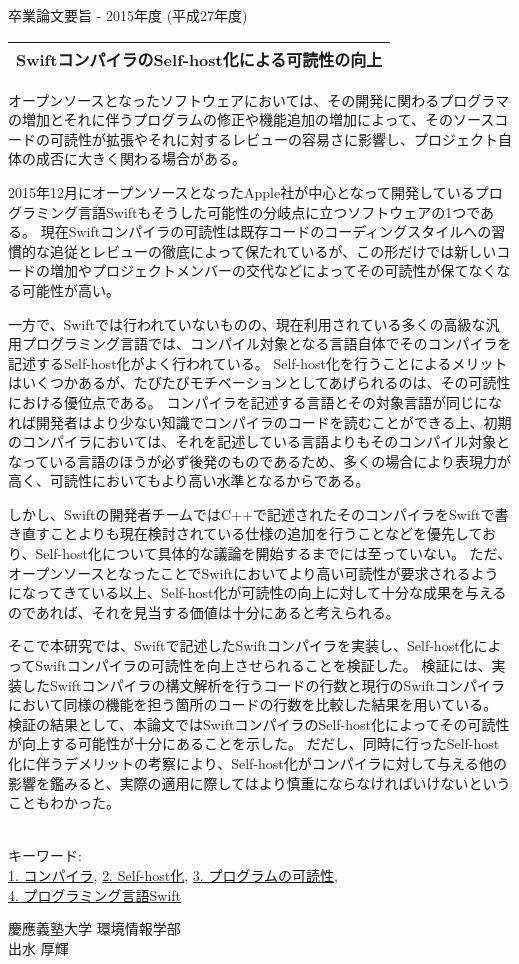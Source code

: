 卒業論文要旨 - 2015年度 (平成27年度)
\begin{center}
\begin{Large}
\begin{tabular}{|c|} \hline
SwiftコンパイラのSelf-host化による可読性の向上
\\ \hline
\end{tabular}
\end{Large}
\end{center}

オープンソースとなったソフトウェアにおいては、その開発に関わるプログラマの増加とそれに伴うプログラムの修正や機能追加の増加によって、そのソースコードの可読性が拡張やそれに対するレビューの容易さに影響し、プロジェクト自体の成否に大きく関わる場合がある。

2015年12月にオープンソースとなったApple社が中心となって開発しているプログラミング言語Swiftもそうした可能性の分岐点に立つソフトウェアの1つである。
現在Swiftコンパイラの可読性は既存コードのコーディングスタイルへの習慣的な追従とレビューの徹底によって保たれているが、この形だけでは新しいコードの増加やプロジェクトメンバーの交代などによってその可読性が保てなくなる可能性が高い。

一方で、Swiftでは行われていないものの、現在利用されている多くの高級な汎用プログラミング言語では、コンパイル対象となる言語自体でそのコンパイラを記述するSelf-host化がよく行われている。
Self-host化を行うことによるメリットはいくつかあるが、たびたびモチベーションとしてあげられるのは、その可読性における優位点である。
コンパイラを記述する言語とその対象言語が同じになれば開発者はより少ない知識でコンパイラのコードを読むことができる上、初期のコンパイラにおいては、それを記述している言語よりもそのコンパイル対象となっている言語のほうが必ず後発のものであるため、多くの場合により表現力が高く、可読性においてもより高い水準となるからである。

しかし、Swiftの開発者チームではC++で記述されたそのコンパイラをSwiftで書き直すことよりも現在検討されている仕様の追加を行うことなどを優先しており、Self-host化について具体的な議論を開始するまでには至っていない。
ただ、オープンソースとなったことでSwiftにおいてより高い可読性が要求されるようになってきている以上、Self-host化が可読性の向上に対して十分な成果を与えるのであれば、それを見当する価値は十分にあると考えられる。

そこで本研究では、Swiftで記述したSwiftコンパイラを実装し、Self-host化によってSwiftコンパイラの可読性を向上させられることを検証した。
検証には、実装したSwiftコンパイラの構文解析を行うコードの行数と現行のSwiftコンパイラにおいて同様の機能を担う箇所のコードの行数を比較した結果を用いている。
検証の結果として、本論文ではSwiftコンパイラのSelf-host化によってその可読性が向上する可能性が十分にあることを示した。
だだし、同時に行ったSelf-host化に伴うデメリットの考察により、Self-host化がコンパイラに対して与える他の影響を鑑みると、実際の適用に際してはより慎重にならなければいけないということもわかった。

~ \\
キーワード:\\
\underline{1. コンパイラ},
\underline{2. Self-host化},
\underline{3. プログラムの可読性},\\
\underline{4. プログラミング言語Swift}
\begin{flushright}
慶應義塾大学 環境情報学部\\
出水 厚輝
\end{flushright}
